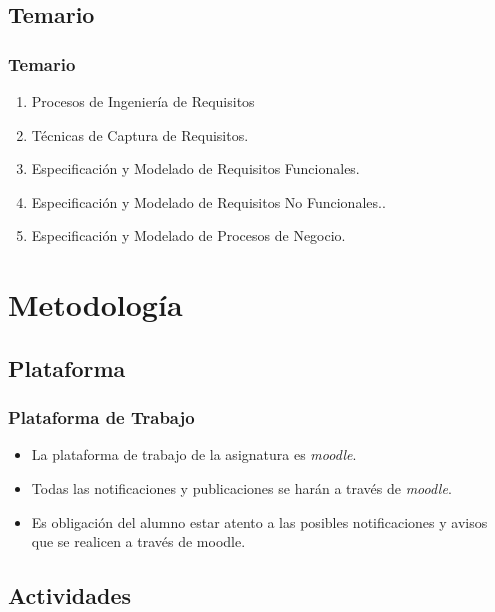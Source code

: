 \documentclass[handout,a4paper,slidestop,xcolor=pst,dvips,blue]{beamer}
\begin{document}
\subsection{Temario}

\begin{frame}[c]
	\frametitle{Temario}
	\begin{enumerate}[<+->]
		\item Procesos de Ingeniería de Requisitos
		\item Técnicas de Captura de Requisitos.
		\item Especificación y Modelado de Requisitos Funcionales.
		\item Especificación y Modelado de Requisitos No Funcionales..
		\item Especificación y Modelado de Procesos de Negocio.
	\end{enumerate}
\end{frame}

\section{Metodología}

\subsection{Plataforma}

\begin{frame}[c]
	\frametitle{Plataforma de Trabajo}
	\begin{itemize}
		\item<1-> La plataforma de trabajo de la asignatura es \emph{moodle}.
		\item<2-> Todas las notificaciones y publicaciones se harán a través de \emph{moodle}.
		\item<3-> \alert{Es obligación del alumno estar atento a las posibles notificaciones y avisos que se realicen a través de moodle}.
	\end{itemize}
\end{frame}

\subsection{Actividades}
\end{document}
